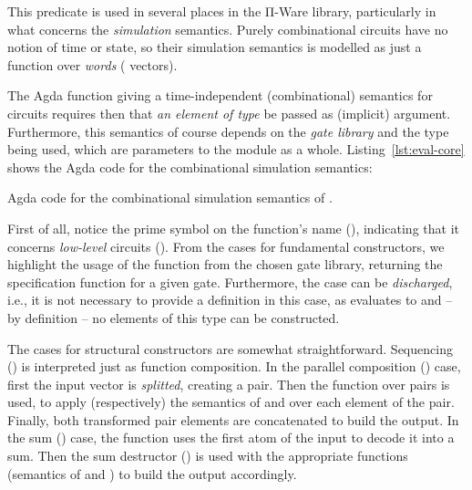             This predicate is used in several places in the Π-Ware library, particularly in what concerns
            the \emph{simulation} semantics.
            Purely combinational circuits have no notion of time or state, so their simulation semantics
            is modelled as just a function over \emph{words} ( vectors).

            The Agda function giving a time-independent (combinational) semantics for circuits requires then
            that \emph{an element of type } be passed as (implicit) argument.
            Furthermore, this semantics of course depends on the \emph{gate library} and the
             type being used, which are parameters to the  module as a whole.
            Listing~\ref{lst:eval-core} shows the Agda code for the combinational simulation semantics:

            \begin{listing}[h]
                \caption{Agda code for the combinational simulation semantics of .\label{lst:eval-core}}
            \end{listing}

            First of all, notice the prime symbol on the function's name (),
            indicating that it concerns \emph{low-level} circuits ().
            From the cases for fundamental constructors, we highlight the usage of the 
            function from the chosen gate library, returning the specification function for a given gate.
            Furthermore, the  case can be \emph{discharged}, i.e.,
            it is not necessary to provide a definition in this case,
            as  \AY{(} \AY{)} evaluates to 
            and – by definition – no elements of this type can be constructed.

            The cases for structural constructors are somewhat straightforward.
            Sequencing () is interpreted just as function composition.
            In the parallel composition () case, first the input vector is \emph{splitted}, creating a pair.
            Then the  function over pairs is used, to apply (respectively) the semantics of 
            and  over each element of the pair.
            Finally, both transformed pair elements are concatenated to build the output.
            In the sum () case, the  function uses the first atom of the input
            to decode it into a sum.
            Then the sum destructor () is used with the appropriate functions
            (semantics of  and ) to build the output accordingly.

